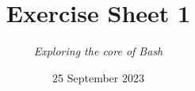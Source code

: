 




\title{{\vspace{-12mm}\huge\textbf{Exercise Sheet 1}}}
\author{\textit{Exploring the core of Bash}}
\date{{\small 25 September 2023}}


    \maketitle
    \bigskip
    
    \bigskip
    
    \bigskip
    
    \bigskip
    
    \bigskip
    
    \bigskip
    
